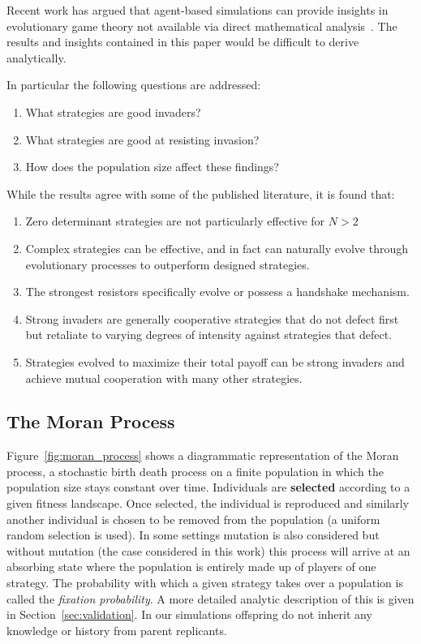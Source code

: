 \documentclass[10pt,journal]{IEEEtran}
\begin{document}
Recent work has argued that agent-based
simulations can provide insights in evolutionary game theory not available
via direct mathematical analysis~\cite{adami2016evolutionary}. The results
and insights contained in this paper would be difficult to derive analytically.

In particular the following questions are addressed:
\begin{enumerate}
    \item What strategies are good invaders?
    \item What strategies are good at resisting invasion?
    \item How does the population size affect these findings?
\end{enumerate}

While the results agree with some of the published literature, it is found that:

\begin{enumerate}
 \item Zero determinant strategies are not particularly effective for $N > 2$
 \item Complex strategies can be effective, and in fact can naturally evolve
     through evolutionary processes to outperform designed strategies.
 \item The strongest resistors specifically evolve or possess a handshake mechanism.
 \item Strong invaders are generally cooperative strategies that do not defect
 first but retaliate to varying degrees of intensity against strategies that defect.
 \item Strategies evolved to maximize their total payoff can be strong invaders
 and achieve mutual cooperation with many other strategies.
\end{enumerate}

\subsection{The Moran Process}\label{sec:the_moran_process}

Figure~\ref{fig:moran_process} shows a diagrammatic representation of the Moran
process, a stochastic birth death process on a finite population in which the
population size stays constant over time. Individuals are \textbf{selected}
according to a given fitness landscape. Once selected, the individual is
reproduced and similarly another individual is chosen to be removed from the
population (a uniform random selection is used). In some settings mutation is
also considered but without mutation
(the case considered in this work) this process will arrive at an absorbing
state where the population is entirely made up of players of one strategy. The
probability with which a given strategy takes over a population is called the
\textit{fixation probability}. A more detailed analytic description of this is
given in Section~\ref{sec:validation}. In our simulations offspring do not
inherit any knowledge or history from parent replicants.
\end{document}
